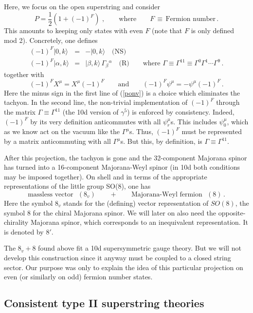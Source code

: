 \documentclass[12pt]{article}
\newcommand{\be}{\begin{equation}}
\newcommand{\ee}{\end{equation}}
\newcommand{\bea}{\begin{eqnarray}}
\newcommand{\eea}{\end{eqnarray}}
\numberwithin{equation}{section}
\begin{document}
Here, we focus on the open superstring and consider 
\be
P=\frac{1}{2}(1+(-1)^F)\,\,,\qquad\mbox{where}\qquad F\,\equiv\,\mbox{Fermion number}\,.
\ee
This amounts to keeping only states with even $F$ (note that $F$ is only defined mod 2). Concretely, one defines
\bea
(-1)^F|0,k\rangle &=& -|0,k\rangle\quad\mbox{(NS)} \nonumber
\\
(-1)^F|\alpha,k\rangle &=& |\beta,k\rangle\,\Gamma_{\beta}{}^\alpha\quad\mbox{(R)} \qquad\mbox{where}\,\,\Gamma\equiv \Gamma^{11}\equiv \Gamma^0\Gamma^1\cdots\Gamma^9\,.
\label{ponv}
\eea
together with
\be
(-1)^FX^\mu=X^\mu(-1)^F\qquad\mbox{and}\qquad (-1)^F\psi^\mu=-\psi^\mu(-1)^F\,.
\ee
Here the minus sign in the first line of (\ref{ponv}) is a choice which eliminates the tachyon. In the second line, the non-trivial implementation of $(-1)^F$ through the matrix $\Gamma\equiv\Gamma^{11}$ (the 10d version of $\gamma^5$) is enforced by consistency. Indeed, $(-1)^F$ by its very definition anticommutes with all $\psi^\mu_r$s.
This includes $\psi^\mu_0$, which as we know act on the vacuum like the $\Gamma^\mu$s. Thus, $(-1)^F$ must be represented by a matrix anticommuting with all $\Gamma^\mu$s. But this, by definition, is $\Gamma\equiv\Gamma^{11}$.

After this projection, the tachyon is gone and the 32-component Majorana spinor has turned into a 16-component Majorana-Weyl spinor (in 10d both conditions may be imposed together). On shell and in terms of the appropriate representations of the little group SO(8), one has
\be
\mbox{massless vector}\,\,\,\,(8_v)\qquad+\qquad \mbox{Majorana-Weyl fermion}\,\,\,\,(8)\,.
\ee
Here the symbol $8_v$ stands for the (defining) vector representation of $SO(8)$, the symbol $8$ for the chiral Majorana spinor. We will later on also need the opposite-chirality Majorana spinor, which corresponds to an inequivalent representation. It is denoted by $8'$.

The $8_v+8$ found above fit a 10d supersymmetric gauge theory. But we will not develop this construction since it anyway must be coupled to a closed string sector. Our purpose was only to explain the idea of this particular projection on even (or similarly on odd) fermion number states.






\subsection{Consistent type II superstring theories}
\end{document}
